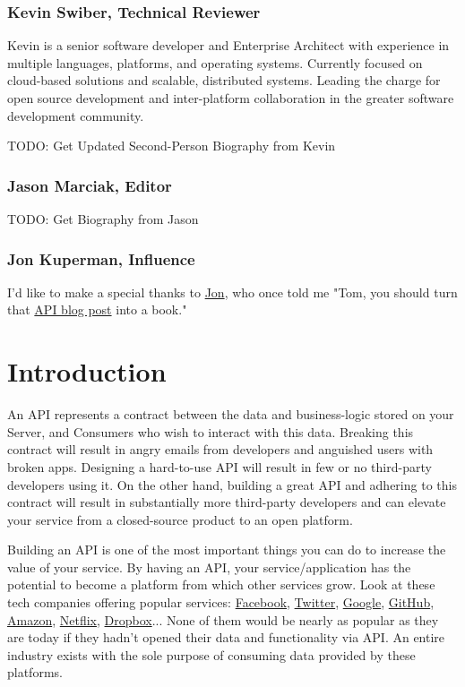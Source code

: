 \documentclass{book}
\begin{document}
\subsubsection*{Kevin Swiber, Technical Reviewer}

Kevin is a senior software developer and Enterprise Architect with experience in multiple languages, platforms, and operating systems. Currently focused on cloud-based solutions and scalable, distributed systems. Leading the charge for open source development and inter-platform collaboration in the greater software development community.

TODO: Get Updated Second-Person Biography from Kevin

\subsubsection*{Jason Marciak, Editor}

TODO: Get Biography from Jason

\subsubsection*{Jon Kuperman, Influence}

I'd like to make a special thanks to \href{https://twitter.com/thecodeplanet}{Jon}, who once told me "Tom, you should turn that \href{http://codeplanet.io/principles-good-restful-api-design/}{API blog post} into a book."

\newpage

\section*{Introduction}

An API represents a contract between the data and business-logic stored on your Server, and Consumers who wish to interact with this data. Breaking this contract will result in angry emails from developers and anguished users with broken apps. Designing a hard-to-use API will result in few or no third-party developers using it. On the other hand, building a great API and adhering to this contract will result in substantially more third-party developers and can elevate your service from a closed-source product to an open platform.

Building an API is one of the most important things you can do to increase the value of your service. By having an API, your service/application has the potential to become a platform from which other services grow. Look at these tech companies offering popular services: \href{https://developers.facebook.com/}{Facebook}, \href{https://dev.twitter.com/docs/api/1.1}{Twitter}, \href{https://developers.google.com/}{Google}, \href{http://developer.github.com/v3/}{GitHub}, \href{https://developer.amazon.com/}{Amazon}, \href{http://developer.netflix.com/}{Netflix}, \href{https://www.dropbox.com/developers/core/docs}{Dropbox}... None of them would be nearly as popular as they are today if they hadn't opened their data and functionality via API. An entire industry exists with the sole purpose of consuming data provided by these platforms.
\end{document}
